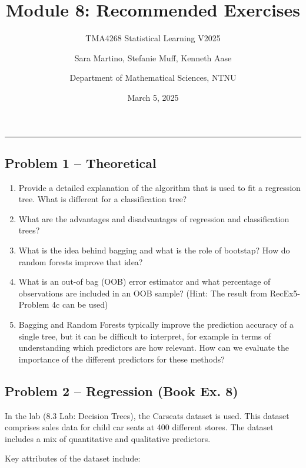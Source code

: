 \documentclass[
]{article}
\title{Module 8: Recommended Exercises}
\subtitle{TMA4268 Statistical Learning V2025}
\author{Sara Martino, Stefanie Muff, Kenneth Aase \and Department of
Mathematical Sciences, NTNU}
\date{March 5, 2025}
\begin{document}
\maketitle

\begin{center}\rule{0.5\linewidth}{0.5pt}\end{center}

\subsection{Problem 1 -- Theoretical}\label{problem-1-theoretical}

\begin{enumerate}
\def\labelenumi{\alph{enumi})}
\item
  Provide a detailed explanation of the algorithm that is used to fit a
  regression tree. What is different for a classification tree?
\item
  What are the advantages and disadvantages of regression and
  classification trees?
\item
  What is the idea behind bagging and what is the role of bootstap? How
  do random forests improve that idea?
\item
  What is an out-of bag (OOB) error estimator and what percentage of
  observations are included in an OOB sample? (Hint: The result from
  RecEx5-Problem 4c can be used)
\item
  Bagging and Random Forests typically improve the prediction accuracy
  of a single tree, but it can be difficult to interpret, for example in
  terms of understanding which predictors are how relevant. How can we
  evaluate the importance of the different predictors for these methods?
\end{enumerate}

\subsection{Problem 2 -- Regression (Book Ex.
8)}\label{problem-2-regression-book-ex.-8}

In the lab (8.3 Lab: Decision Trees), the Carseats dataset is used. This
dataset comprises sales data for child car seats at 400 different
stores. The dataset includes a mix of quantitative and qualitative
predictors.

Key attributes of the dataset include:
\end{document}
